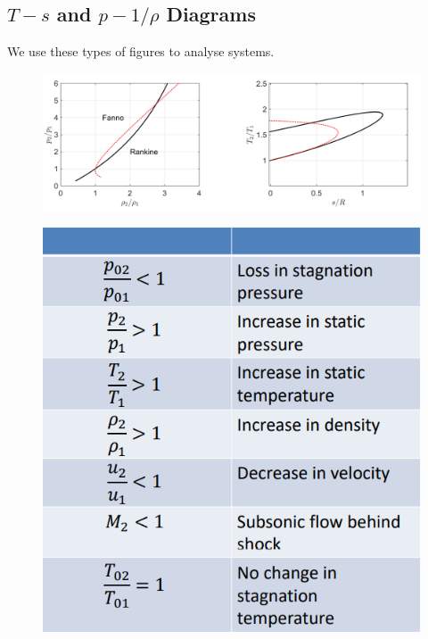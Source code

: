 \documentclass[class=report, crop=false, 12pt,a4paper]{standalone}
\begin{document}
\subsection{$T-s$ and $p-{1/\rho}$ Diagrams}
We use these types of figures to analyse systems.
\begin{figure}[H]
    \centering
    \includegraphics[width = 1 \textwidth]{../img/diagram8.PNG} 
    \caption{}
\end{figure}
\begin{figure}[H]
    \centering
    \includegraphics[width = 0.5 \textwidth]{../img/diagram9.PNG} 
    \caption{}
\end{figure}
\end{document}
